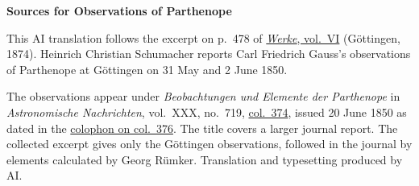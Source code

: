 \clearpage\thispagestyle{empty}
\begin{center}\textbf{Sources for Observations of Parthenope}\end{center}
\noindent This AI translation follows the excerpt on p.~478 of \href{https://gdz.sub.uni-goettingen.de/id/PPN236007467}{\textit{Werke}, vol.~VI} (Göttingen, 1874). Heinrich Christian Schumacher reports Carl Friedrich Gauss’s observations of Parthenope at Göttingen on 31 May and 2 June 1850.
\par\smallskip\noindent The observations appear under \textit{Beobachtungen und Elemente der Parthenope} in \textit{Astronomische Nachrichten}, vol.~XXX, no.~719, \href{https://api.digitale-sammlungen.de/iiif/image/v2/bsb10049455_00191/full/1800,/0/default.jpg}{col.~374}, issued 20 June 1850 as dated in the \href{https://api.digitale-sammlungen.de/iiif/image/v2/bsb10049455_00192/full/1800,/0/default.jpg}{colophon on col.~376}. The title covers a larger journal report. The collected excerpt gives only the Göttingen observations, followed in the journal by elements calculated by Georg Rümker. Translation and typesetting produced by AI.
\clearpage
